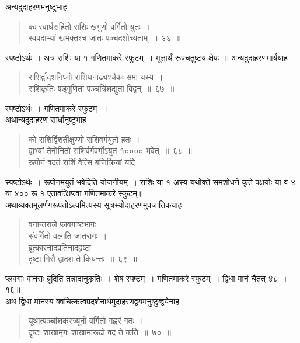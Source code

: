 \documentclass[11pt, openany]{book}
\begin{document}
\vspace{-3mm}
 अन्यदुदाहरणमनुष्टुभाह\textendash 
\begin{quote}
    \ex
    कः स्वार्धसहितो राशिः खगुणो वर्गितो युतः~। \\
 स्वपदाभ्यां खभक्तश्च जातः पञ्चदशोच्यताम्~॥~६६~॥~
\end{quote}
 
स्पष्टोऽर्थः~। अत्र राशिः या १ गणितमाकरे स्फुटम्~। मूलार्थं रूपचतुष्टयं क्षेपः~॥ 
\newpage%
 अन्यदुदाहरणमार्ययाह\textendash 
\begin{quote}
    \ex
     राशिर्द्वादशनिघ्नो राशिघनाढ्यश्चैकः समा यस्य~। \\
 राशिकृतिः षड्गुणिता पञ्चत्रिंशद्युता विद्वन्~॥~६७~॥~
\end{quote}
 
स्पष्टोऽर्थः~। गणितमाकरे स्फुटम्~॥ \\

\vspace{-3mm}
 अथान्यदुदाहरणं सार्धानुष्टुभाह\textendash 
\begin{quote}
    \ex
     को राशिर्द्विशतीक्षुण्णो राशिवर्गयुतो हतः~। \\
 द्वाभ्यां तेनोनितो राशिर्वर्गवर्गोऽयुतं १०००० भवेत्~॥~६८~॥~\\

\vspace{-5mm}
 रूपोनं वदतं राशिं वेत्सि बजिक्रियां यदि 
\end{quote}

 स्पष्टोऽर्थः~। रूपोनमयुतं भवेदिति योजनीयम्~। राशिः या १ अस्य 
यथोक्ते समशोधने कृते पक्षयोः या व ४ या ४०० रू १ एतावत्क्षिप्त्वा 
गणितमाकरे स्फुटम्॥ \\

\vspace{-3mm}
 अथाव्यक्तमूलर्णगरूपतोऽल्पमित्यस्य सूत्रस्योदाहरणमुपजातिकयाह\textendash 
\begin{quote}
    \ex
     वनान्तराले प्लवगाष्टभागः \\
 संवर्गितो वल्गति जातरागः~। \\
 ब्रूत्कारनादप्रतिनादहृष्टा \\
 दृष्टा गिरौ द्वादश ते कियन्तः~॥~६९~॥~
\end{quote}
 
प्लवगाः वानराः ब्रूदिति तन्नादानुकृतिः~। शेषं स्पष्टम्~। गणितमाकरे 
स्फुटम्~। द्विधा मानं चैतत् ४८~। १६॥ \\

\vspace{-3mm}
 अथ द्विधा मानस्य क्वचित्कत्वप्रदर्शनार्थमुदाहरणद्वयमनुष्टुब्द्वयेनाह\textendash 
\begin{quote}
    \ex
यूथात्पञ्चांशकस्त्र्यूनो वर्गितो गह्वरं गतः~। \\
 दृष्टः शाखामृगः शाखामारूढो वद ते कति~॥~७०~॥
 \end{quote}
\end{document}
